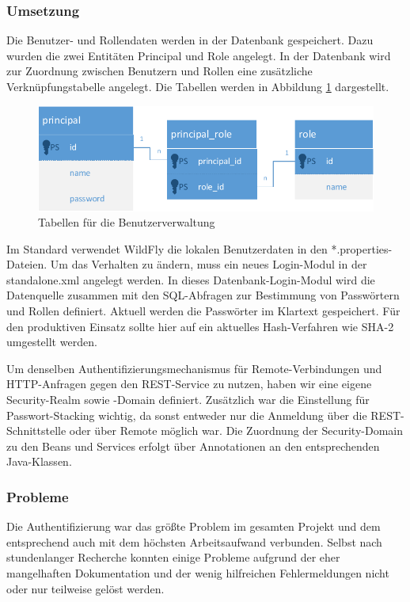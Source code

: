 \subsubsection{Umsetzung}
Die Benutzer- und Rollendaten werden in der Datenbank gespeichert. Dazu wurden die zwei Entitäten Principal und Role angelegt. In der Datenbank wird zur Zuordnung zwischen Benutzern und Rollen eine zusätzliche Verknüpfungstabelle angelegt. Die Tabellen werden in Abbildung \ref{fig:BenutzerRollen} dargestellt.

\begin{figure}[tbh]
\centering
\includegraphics[width=0.8\linewidth]{Bilder/BenutzerRollen}
\caption{Tabellen für die Benutzerverwaltung}
\label{fig:BenutzerRollen}
\end{figure}

Im Standard verwendet WildFly die lokalen Benutzerdaten in den *.properties-Dateien. Um das Verhalten zu ändern, muss ein neues Login-Modul in der standalone.xml angelegt werden. In dieses Datenbank-Login-Modul wird die Datenquelle zusammen mit den SQL-Abfragen zur Bestimmung von Passwörtern und Rollen definiert. Aktuell werden die Passwörter im Klartext gespeichert. Für den produktiven Einsatz sollte hier auf ein aktuelles Hash-Verfahren wie SHA-2 umgestellt werden.

Um denselben Authentifizierungsmechanismus für Remote-Verbindungen und HTTP-Anfragen gegen den REST-Service zu nutzen, haben wir eine eigene Security-Realm sowie -Domain definiert. Zusätzlich war die Einstellung für Passwort-Stacking wichtig, da sonst entweder nur die Anmeldung über die REST-Schnittstelle oder über Remote möglich war. Die Zuordnung der Security-Domain zu den Beans und Services erfolgt über Annotationen an den entsprechenden Java-Klassen. 

\subsubsection{Probleme}
Die Authentifizierung war das größte Problem im gesamten Projekt und dem entsprechend auch mit dem höchsten Arbeitsaufwand verbunden. Selbst nach stundenlanger Recherche konnten einige Probleme aufgrund der eher mangelhaften Dokumentation und der wenig hilfreichen Fehlermeldungen nicht oder nur teilweise gelöst werden.

